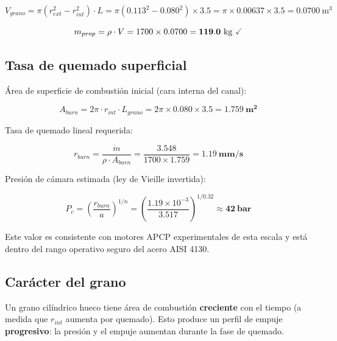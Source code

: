 \documentclass[11pt, a4paper]{article}
\newcommand{\cmark}{\textcolor{tlvgreen}{\textbf{\checkmark}}}
\begin{document}
\begin{equation}
  V_{grano} = \pi (r_{ext}^2 - r_{int}^2) \cdot L
  = \pi (0.113^2 - 0.080^2) \times 3.5
  = \pi \times 0.00637 \times 3.5
  = 0.0700\ \text{m}^3
\end{equation}

\begin{equation}
  m_{prop} = \rho \cdot V = 1700 \times 0.0700 = \mathbf{119.0\ \text{kg}}\ \cmark
\end{equation}

\subsection{Tasa de quemado superficial}

\'{A}rea de superficie de combusti\'{o}n inicial (cara interna del canal):

\begin{equation}
  A_{burn} = 2\pi \cdot r_{int} \cdot L_{grano}
  = 2\pi \times 0.080 \times 3.5 = \mathbf{1.759\ \text{m}^2}
\end{equation}

Tasa de quemado lineal requerida:

\begin{equation}
  r_{burn} = \frac{\dot{m}}{\rho \cdot A_{burn}}
  = \frac{3.548}{1700 \times 1.759}
  = \mathbf{1.19\ \text{mm/s}}
\end{equation}

Presi\'{o}n de c\'{a}mara estimada (ley de Vieille invertida):

\begin{equation}
  P_c = \left(\frac{r_{burn}}{a}\right)^{1/n}
  = \left(\frac{1.19 \times 10^{-3}}{3.517}\right)^{1/0.32}
  \approx \mathbf{42\ \text{bar}}
\end{equation}

Este valor es consistente con motores APCP experimentales de esta escala y est\'{a} dentro del rango operativo seguro del acero AISI 4130.

\subsection{Car\'{a}cter del grano}

Un grano cilíndrico hueco tiene \'{a}rea de combusti\'{o}n \textbf{creciente} con el tiempo (a medida que $r_{int}$ aumenta por quemado). Esto produce un perfil de empuje \textbf{progresivo}: la presi\'{o}n y el empuje aumentan durante la fase de quemado.
\end{document}
